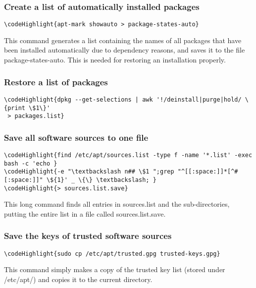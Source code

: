\documentclass[12pt,a4paper]{article}
\begin{document}
\subsubsection{Create a list of automatically installed packages}
\begin{Verbatim}[commandchars=\\\{\}]
\codeHighlight{apt-mark showauto > package-states-auto}
\end{Verbatim}
This command generates a list containing the names of all packages that have been installed automatically due to dependency reasons, and saves it to the file package-states-auto.  This is needed for restoring an installation properly.

\subsubsection{Restore a list of packages}
\begin{Verbatim}[commandchars=\\\{\}]
\codeHighlight{dpkg --get-selections | awk '!/deinstall|purge|hold/ \{print \$1\}'
 > packages.list}
\end{Verbatim}

\subsubsection{Save all software sources to one file}
\begin{Verbatim}[commandchars=\\\{\}]
\codeHighlight{find /etc/apt/sources.list -type f -name '*.list' -exec bash -c 'echo }
\codeHighlight{-e "\textbackslash n## \$1 ";grep "^[[:space:]]*[^#[:space:]]" \${1}' _ \{\} \textbackslash; }
\codeHighlight{> sources.list.save}
\end{Verbatim}
This long command finds all entries in sources.list and the sub-directories, putting the entire list in a file called sources.list.save.

\subsubsection{Save the keys of trusted software sources}
\begin{Verbatim}[commandchars=\\\{\}]
\codeHighlight{sudo cp /etc/apt/trusted.gpg trusted-keys.gpg}
\end{Verbatim}
This command simply makes a copy of the trusted key list (stored under /etc/apt/) and copies it to the current directory.
\end{document}
